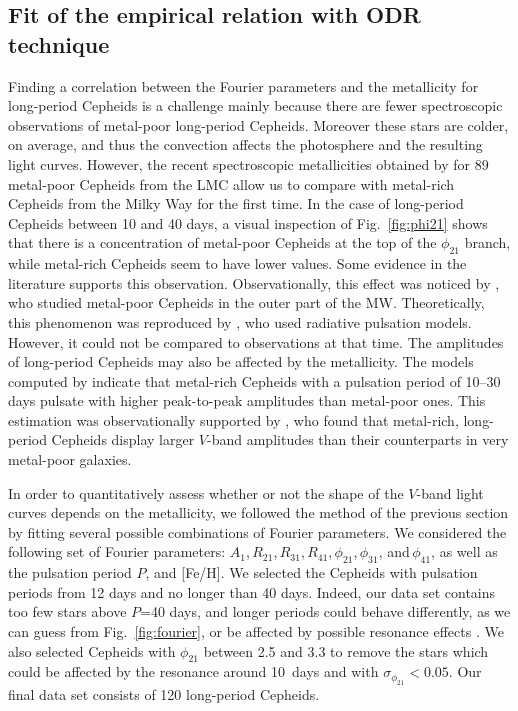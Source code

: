 \documentclass[article]{aa} %
\begin{document}
\subsection{Fit of the empirical relation with ODR technique}
Finding a correlation between the Fourier parameters and the metallicity for long-period Cepheids is a challenge mainly because there are fewer spectroscopic observations of metal-poor long-period Cepheids. Moreover these stars are colder, on average, and thus the convection affects the photosphere and the resulting light curves. However, the recent spectroscopic metallicities obtained by \cite{Romaniello2022} for 89 metal-poor Cepheids from the LMC allow us to compare with metal-rich Cepheids from the Milky Way for
the first time. In the case of long-period Cepheids between 10 and 40 days, a visual inspection of Fig.~\ref{fig:phi21} shows that there is a concentration of metal-poor Cepheids at the top of the $\phi_{21}$ branch, while metal-rich Cepheids seem to have lower values. Some evidence in the literature supports this observation. Observationally, this effect was noticed by \cite{Pont2001}, who studied metal-poor Cepheids in the outer part of the MW. Theoretically, this phenomenon was reproduced by \cite{Buchler1997,Buchler1998}, who used radiative pulsation models. However, it could not be compared to observations at that time. The amplitudes of long-period Cepheids may also be affected by the metallicity. The models computed by \cite{Bono2000} indicate that metal-rich Cepheids with a pulsation period of 10–30$\,$days pulsate with higher peak-to-peak amplitudes than metal-poor ones.  This estimation was observationally supported by  \cite{Majaess2013}, who found that metal-rich, long-period Cepheids display larger $V$-band amplitudes than
their counterparts in very metal-poor galaxies.

In order to quantitatively assess whether or not the shape of the $V$-band light curves depends on the metallicity, we followed the method of the previous section by fitting several possible combinations of Fourier parameters. We considered the following set of Fourier parameters: $A_1$,$\,R_{21}$,$\,R_{31}$,$\,R_{41}$,$\,\phi_{21}$,$\,\phi_{31}$, and$\,\phi_{41}$, as well as the pulsation period $P$, and [Fe/H].
 We selected the Cepheids with pulsation periods from 12 days and no longer than 40 days. Indeed, our data set contains too few stars above $P$=40 days, and longer periods could behave differently, as we can guess from Fig.~\ref{fig:fourier}, or be affected by possible resonance effects \citep{Antonello1998}. We also selected Cepheids with $\phi_{21}$ between 2.5 and 3.3 to remove the stars which could be affected by the resonance around 10~days and with $\sigma_{\phi_{21}}<0.05$.  Our final data set consists of 120 long-period Cepheids.
\end{document}
